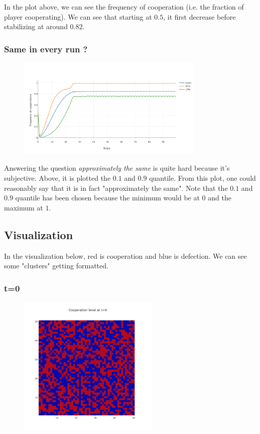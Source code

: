 \documentclass[11pt]{article}
\begin{document}
In the plot above, we can see the frequency of cooperation (i.e. the fraction of player cooperating). We can see that starting at $0.5$, it first decrease before stabilizing at around $0.82$.

\subsubsection{Same in every run ?}

\begin{figure}[H]
\centering
   \includegraphics[width=0.8\textwidth]{img/part1/cf-moore-notmyself-90-10.png}
\end{figure}

Answering the question \textit{approximately the same} is quite hard because it's subjective. Above, it is plotted the $0.1$ and $0.9$ quantile. From this plot, one could reasonably say that it is in fact "approximately the same". Note that the $0.1$ and $0.9$ quantile has been chosen because the minimum would be at $0$ and the maximum at $1$.

\subsection{Visualization}

In the visualization below, red is cooperation and blue is defection. We can see some "clusters" getting formatted.

\subsubsection{t=0}

\begin{figure}[H]
\centering
   \includegraphics[width=0.6\textwidth]{img/part1/cf-moore-visu-0.png}
\end{figure}
\end{document}

